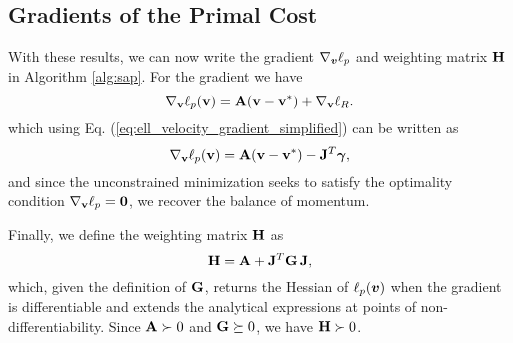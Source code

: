 \subsection{Gradients of the Primal Cost}
With these results, we can now write the gradient $\nabla_{\bm{v}}\ell_p$ and weighting matrix ${\mathbf{H}}$ in Algorithm \ref{alg:sap}. For the gradient we
have
\begin{equation*}
	\nabla_{\mathbf{v}}\ell_p({\mathbf{v}}) = {\mathbf{A}}({\mathbf{v}}-{\mathbf{v}}^*) + \nabla_{\mathbf{v}}\ell_R.
\end{equation*}
which using Eq. (\ref{eq:ell_velocity_gradient_simplified}) can be written as
\begin{equation*}
	\nabla_{\mathbf{v}}\ell_p({\mathbf{v}}) = {\mathbf{A}}({\mathbf{v}}-{\mathbf{v}}^*) - {\mathbf{J}}^T{\bm\gamma},
\end{equation*}
and since the unconstrained minimization seeks to satisfy the optimality
condition $\nabla_{\mathbf{v}}\ell_p={\mathbf{0}}$, we recover the balance of momentum.

Finally, we define the weighting matrix ${\mathbf{H}}$ as
\begin{equation*}
	{\mathbf{H}} = {\mathbf{A}} + {\mathbf{J}}^T{\mathbf{G}}\,{\mathbf{J}},
\end{equation*}
which, given the definition of ${\mathbf{G}}$, returns the Hessian of $\ell_p({\bm{v}})$
when the gradient is differentiable and extends the analytical expressions at
points of non-differentiability. Since ${\mathbf{A}}\succ 0$ and ${\mathbf{G}} \succeq 0$,
we have ${\mathbf{H}}\succ 0$.
